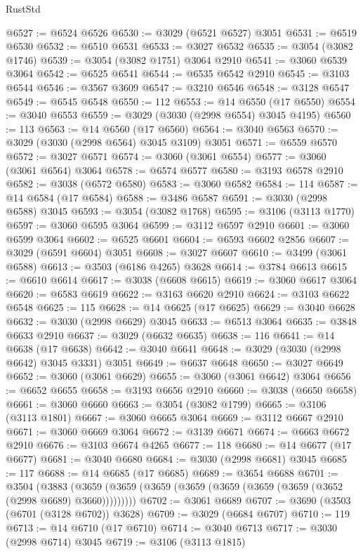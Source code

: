 \begin{lexlean}{RustStd}
\begin{coremodule}
@6527 := @6524 @6526
@6530 := @3029 (@6521 @6527) @3051
@6531 := @6519 @6530
@6532 := @6510 @6531
@6533 := @3027 @6532
@6535 := @3054 (@3082 @1746)
@6539 := @3054 (@3082 @1751) @3064 @2910
@6541 := @3060 @6539 @3064
@6542 := @6525 @6541
@6544 := @6535 @6542 @2910
@6545 := @3103 @6544
@6546 := @3567 @3609
@6547 := @3210 @6546
@6548 := @3128 @6547
@6549 := @6545 @6548
@6550 := 112
@6553 := @14 @6550 (@17 @6550)
@6554 := @3040 @6553
@6559 := @3029 (@3030 (@2998 @6554) @3045 @4195)
@6560 := 113
@6563 := @14 @6560 (@17 @6560)
@6564 := @3040 @6563
@6570 := @3029 (@3030 (@2998 @6564) @3045 @3109) @3051
@6571 := @6559 @6570
@6572 := @3027 @6571
@6574 := @3060 (@3061 @6554)
@6577 := @3060 (@3061 @6564) @3064
@6578 := @6574 @6577
@6580 := @3193 @6578 @2910
@6582 := @3038 (@6572 @6580)
@6583 := @3060 @6582
@6584 := 114
@6587 := @14 @6584 (@17 @6584)
@6588 := @3486 @6587
@6591 := @3030 (@2998 @6588) @3045
@6593 := @3054 (@3082 @1768)
@6595 := @3106 (@3113 @1770)
@6597 := @3060 @6595 @3064
@6599 := @3112 @6597 @2910
@6601 := @3060 @6599 @3064
@6602 := @6525 @6601
@6604 := @6593 @6602 @2856
@6607 := @3029 (@6591 @6604) @3051
@6608 := @3027 @6607
@6610 := @3499 (@3061 @6588)
@6613 := @3503 (@6186 @4265) @3628
@6614 := @3784 @6613
@6615 := @6610 @6614
@6617 := @3038 (@6608 @6615)
@6619 := @3060 @6617 @3064
@6620 := @6583 @6619
@6622 := @3163 @6620 @2910
@6624 := @3103 @6622 @6548
@6625 := 115
@6628 := @14 @6625 (@17 @6625)
@6629 := @3040 @6628
@6632 := @3030 (@2998 @6629) @3045
@6633 := @6513 @3064
@6635 := @3848 @6633 @2910
@6637 := @3029 (@6632 @6635)
@6638 := 116
@6641 := @14 @6638 (@17 @6638)
@6642 := @3040 @6641
@6648 := @3029 (@3030 (@2998 @6642) @3045 @3331) @3051
@6649 := @6637 @6648
@6650 := @3027 @6649
@6652 := @3060 (@3061 @6629)
@6655 := @3060 (@3061 @6642) @3064
@6656 := @6652 @6655
@6658 := @3193 @6656 @2910
@6660 := @3038 (@6650 @6658)
@6661 := @3060 @6660
@6663 := @3054 (@3082 @1799)
@6665 := @3106 (@3113 @1801)
@6667 := @3060 @6665 @3064
@6669 := @3112 @6667 @2910
@6671 := @3060 @6669 @3064
@6672 := @3139 @6671
@6674 := @6663 @6672 @2910
@6676 := @3103 @6674 @4265
@6677 := 118
@6680 := @14 @6677 (@17 @6677)
@6681 := @3040 @6680
@6684 := @3030 (@2998 @6681) @3045
@6685 := 117
@6688 := @14 @6685 (@17 @6685)
@6689 := @3654 @6688
@6701 := @3504
    (@3883 (@3659 (@3659 (@3659 (@3659 (@3659 (@3659 (@3659 (@3652 (@2998 @6689) @3660)))))))))
@6702 := @3061 @6689
@6707 := @3690 (@3503 (@6701 (@3128 @6702)) @3628)
@6709 := @3029 (@6684 @6707)
@6710 := 119
@6713 := @14 @6710 (@17 @6710)
@6714 := @3040 @6713
@6717 := @3030 (@2998 @6714) @3045
@6719 := @3106 (@3113 @1815)

\end{coremodule}
\end{lexlean}
